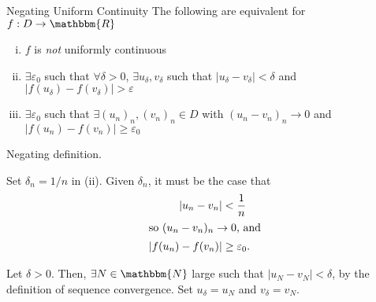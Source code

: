 \documentclass[10pt]{extarticle}
\newcommand{\N}{\mathbbm{N}}
\newcommand{\R}{\mathbbm{R}}
\begin{document}
  \begin{problem}{Negating Uniform Continuity}
    The following are equivalent for $f: D\rightarrow \R$
    \begin{enumerate}[(i)]
      \item $f$ is \textit{not} uniformly continuous
      \item $\exists \varepsilon_0$ such that $\forall \delta > 0$, $\exists u_{\delta},v_{\delta}$ such that $|u_{\delta}-v_{\delta}| < \delta$ and $|f(u_{\delta}) - f(v_{\delta})| > \varepsilon$
      \item $\exists \varepsilon_0$ such that $\exists (u_n)_n,(v_n)_n\in D$ with $\left(u_n - v_n\right)_n \rightarrow 0$ and $|f(u_n) - f(v_n)| \geq \varepsilon_0$
    \end{enumerate}
    \tcblower
    \begin{description}[font=\normalfont]
      \item[(i) $\Leftrightarrow$ (ii):] Negating definition.
      \item[(ii) $\Rightarrow$ (iii):] Set $\delta_n = 1/n$ in (ii). Given $\delta_n$, it must be the case that
        \begin{align*}
          |u_n - v_n| &< \frac{1}{n}\\
          \shortintertext{so $(u_n - v_n)_n \rightarrow 0$, and}
          |f(u_n) - f(v_n)| &\geq \varepsilon_0.
        \end{align*}
      \item[(iii) $\Rightarrow$ (ii):] Let $\delta > 0$. Then, $\exists N\in \N$ large such that $|u_N - v_N| < \delta$, by the definition of sequence convergence. Set $u_{\delta} = u_N$ and $v_{\delta} = v_N$.
    \end{description}
  \end{problem}
\end{document}
